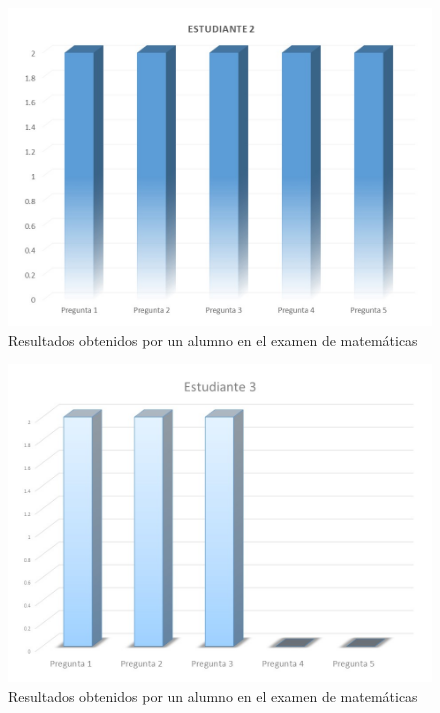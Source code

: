 \documentclass[12pt] {report}
\begin{document}
\begin{figure}[H]
\centering 
\includegraphics[scale=.7]{MEstudiante2.JPG}
\caption{Resultados obtenidos por un alumno en el examen de matemáticas}
\end{figure}
\begin{figure}[H]
\centering 
\includegraphics[scale=.7]{MEstudiante3.JPG}
\caption{Resultados obtenidos por un alumno en el examen de matemáticas}
\end{figure}
\end{document}
